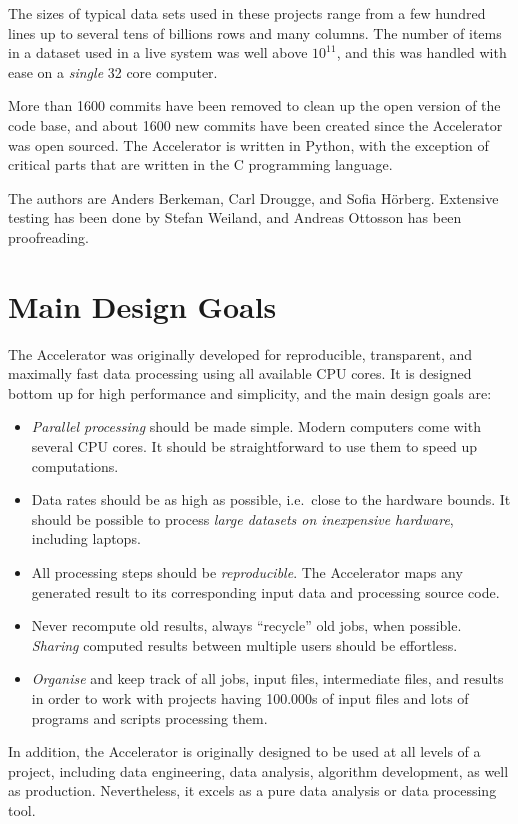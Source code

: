 The sizes of typical data sets used in these projects range from a few
hundred lines up to several tens of billions rows and many columns.
The number of items in a dataset used in a live system was well above
$10^{11}$, and this was handled with ease on a \emph{single} 32 core
computer.

More than 1600 commits have been removed to clean up the open version
of the code base, and about 1600 new commits have been created since
the Accelerator was open sourced.  The Accelerator is written in
Python, with the exception of critical parts that are written in the C
programming language.

The authors are Anders Berkeman, Carl Drougge, and Sofia H\"orberg.
Extensive testing has been done by Stefan Weiland, and Andreas
Ottosson has been proofreading.



\section{Main Design Goals}
The Accelerator was originally developed for reproducible,
transparent, and maximally fast data processing using all available
CPU cores.  It is designed bottom up for high performance and
simplicity, and the main design goals are:
\begin{itemize}

\item[] \textsl{Parallel processing} should be made simple.  Modern computers
  come with several CPU cores.  It should be straightforward to use
  them to speed up computations.
  
\item[] Data rates should be as high as possible, i.e.\ close to the hardware
  bounds.  It should be possible to process \textsl{large datasets on
  inexpensive hardware}, including laptops.

\item[] All processing steps should be \textsl{reproducible}.
  The Accelerator maps any generated result to its corresponding input
  data and processing source code.

\item[] Never recompute old results, always ``recycle'' old jobs, when
  possible.  \textsl{Sharing} computed results between multiple users
  should be effortless.

\item[] \textsl{Organise} and keep track of all jobs, input files,
  intermediate files, and results in order to work with projects having
  100.000s of input files and lots of programs and scripts processing
  them.
  
\end{itemize}
In addition, the Accelerator is originally designed to be used at all
levels of a project, including data engineering, data analysis,
algorithm development, as well as production.  Nevertheless, it excels
as a pure data analysis or data processing tool.
